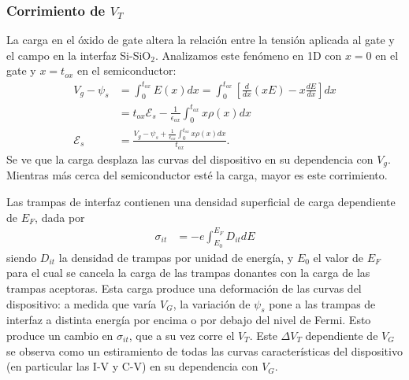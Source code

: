 \subsubsection{Corrimiento de $V_T$}
\label{corrimientovt}
La carga en el óxido de gate altera la relación 
entre la tensión aplicada al gate y el campo en la interfaz Si-SiO$_2$.
Analizamos este fenómeno en 1D con $x=0$ en el gate y $x=t_{ox}$
en el semiconductor:
\begin{align*}
    V_g-\psi_s&=\int_0^{t_{ox}}E(x)dx=
    \int_0^{t_{ox}}\left[\frac d{dx}(xE)-x\frac{dE}{dx}\right]dx\\
    &=t_{ox}\mathscr{E}_s-\frac 1{\epsilon_{ox}}\int_0^{t_{ox}}x\rho(x)dx\\
    \mathscr{E}_s &= \frac{V_g-\psi_s+
        \frac 1{\epsilon_{ox}}\int_0^{t_{ox}}x\rho(x)dx}{t_{ox}}.
\end{align*}
Se ve que la carga desplaza las curvas del dispositivo 
en su dependencia con $V_g$.
Mientras más cerca del semiconductor esté la carga,
mayor es este corrimiento.

Las trampas de interfaz contienen una densidad superficial de carga dependiente
de $E_F$, dada por
\begin{align*}
    \sigma_{it} &= -e\int_{E_0}^{E_F} D_{it}dE
\end{align*}
siendo $D_{it}$ la densidad de trampas por unidad de energía,
y $E_0$ el valor de $E_F$ para el cual se cancela la carga de las trampas
donantes con la carga de las trampas aceptoras.
Esta carga produce una deformación de las curvas del dispositivo:
a medida que varía $V_G$,
la variación de $\psi_s$ pone a las trampas de interfaz a distinta energía
por encima o por debajo del nivel de Fermi.
Esto produce un cambio en $\sigma_{it}$,
que a su vez corre el $V_T$.
Este $\Delta V_T$ dependiente de $V_G$ 
se observa como un estiramiento de todas las curvas características del
dispositivo (en particular las I-V y C-V) en su dependencia con $V_G$.
